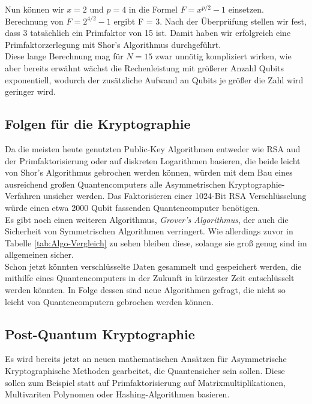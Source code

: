 \documentclass[12pt]{article}
\begin{document}
Nun können wir $x = 2$ und $p = 4$ in die Formel $F = x^{p/2} - 1$ einsetzen. Berechnung von $F = 2^{4/2}-1$ ergibt F = 3. Nach der Überprüfung stellen wir fest, dass 3 tatsächlich ein Primfaktor von 15 ist. Damit haben wir erfolgreich eine Primfaktorzerlegung mit Shor's Algorithmus durchgeführt. \cite{mavroeidis2018impact} \cite{shor1998quantum} \\

Diese lange Berechnung mag für $N = 15$ zwar unnötig kompliziert wirken, wie aber bereits erwähnt wächst die Rechenleistung mit größerer Anzahl Qubits exponentiell, wodurch der zusätzliche Aufwand an Qubits je größer die Zahl wird geringer wird.

\subsection{Folgen für die Kryptographie}

Da die meisten heute genutzten Public-Key Algorithmen entweder wie RSA aud der Primfaktorisierung oder auf diskreten Logarithmen basieren, die beide leicht von Shor's Algorithmus gebrochen werden können, würden mit dem Bau eines ausreichend großen Quantencomputers alle Asymmetrischen Kryptographie-Verfahren unsicher werden. Das Faktorisieren einer 1024-Bit RSA Verschlüsselung würde einen etwa 2000 Qubit fassenden Quantencomputer benötigen. \\

Es gibt noch einen weiteren Algorithmus, \textit{Grover's Algorithmus}, der auch die Sicherheit von Symmetrischen Algorithmen verringert. Wie allerdings zuvor in Tabelle \ref{tab:Algo-Vergleich} zu sehen bleiben diese, solange sie groß genug sind im allgemeinen sicher. \cite{mavroeidis2018impact} \\

Schon jetzt könnten verschlüsselte Daten gesammelt und gespeichert werden, die mithilfe eines Quantencomputers in der Zukunft in kürzester Zeit entschlüsselt werden könnten. In Folge dessen sind neue Algorithmen gefragt, die nicht so leicht von Quantencomputern gebrochen werden können.

\subsection{Post-Quantum Kryptographie}

Es wird bereits jetzt an neuen mathematischen Ansätzen für Asymmetrische Kryptographische Methoden gearbeitet, die Quantensicher sein sollen. Diese sollen zum Beispiel statt auf Primfaktorisierung auf Matrixmultiplikationen, Multivariten Polynomen oder Hashing-Algorithmen basieren. \cite{mavroeidis2018impact} \\
\end{document}
